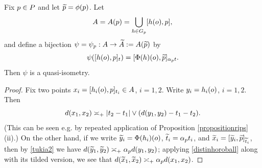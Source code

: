 {\begin{lemma}
\label{lemmatukia2}
Fix $p\in P$ and let $\widetilde{p} = \phi(p)$. Let
\[
A = A(p) = \bigcup_{h\in G_p} [h(o),p],
\]
and define a bijection $\psi = \psi_p:A\to \widetilde A := A(\widetilde{p})$ by
\[
\psi([h(o),p]_t) = [\Phi(h)(o),\widetilde{p}]_{\alpha_p t}.
\]
Then $\psi$ is a quasi-isometry.
\end{lemma}
\begin{proof}
Fix two points $x_i = [h_i(o),p]_{t_i} \in A$, $i = 1,2$. Write $y_i = h_i(o)$, $i = 1,2$. Then
\begin{equation}
\label{distinhoroball}
d(x_1,x_2) \asymp_+ |t_2 - t_1| \vee (d(y_1,y_2) - t_1 - t_2).
\end{equation}
(This can be seen e.g. by repeated application of Proposition \ref{propositionrips}(ii).) On the other hand, if we write $\widetilde y_i = \Phi(h_i)(o)$, $\widetilde t_i = \alpha_p t_i$, and $\widetilde x_i = [\widetilde y_i,\widetilde{p}]_{\widetilde t_i}$, then by \eqref{tukia2} we have $d(\widetilde y_1,\widetilde y_2) \asymp_+ \alpha_p d(y_1,y_2)$; applying \eqref{distinhoroball} along with its tilded version, we see that $d(\widetilde x_1,\widetilde x_2) \asymp_+ \alpha_p d(x_1,x_2)$.
\end{proof}

}
